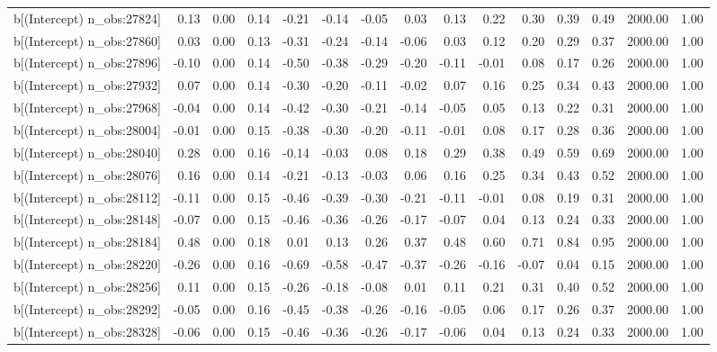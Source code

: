 \begin{table}[ht]
\begin{tabular}{rrrrrrrrrrrrrrr}
  b[(Intercept) n\_obs:27824] & 0.13 & 0.00 & 0.14 & -0.21 & -0.14 & -0.05 & 0.03 & 0.13 & 0.22 & 0.30 & 0.39 & 0.49 & 2000.00 & 1.00 \\ 
  b[(Intercept) n\_obs:27860] & 0.03 & 0.00 & 0.13 & -0.31 & -0.24 & -0.14 & -0.06 & 0.03 & 0.12 & 0.20 & 0.29 & 0.37 & 2000.00 & 1.00 \\ 
  b[(Intercept) n\_obs:27896] & -0.10 & 0.00 & 0.14 & -0.50 & -0.38 & -0.29 & -0.20 & -0.11 & -0.01 & 0.08 & 0.17 & 0.26 & 2000.00 & 1.00 \\ 
  b[(Intercept) n\_obs:27932] & 0.07 & 0.00 & 0.14 & -0.30 & -0.20 & -0.11 & -0.02 & 0.07 & 0.16 & 0.25 & 0.34 & 0.43 & 2000.00 & 1.00 \\ 
  b[(Intercept) n\_obs:27968] & -0.04 & 0.00 & 0.14 & -0.42 & -0.30 & -0.21 & -0.14 & -0.05 & 0.05 & 0.13 & 0.22 & 0.31 & 2000.00 & 1.00 \\ 
  b[(Intercept) n\_obs:28004] & -0.01 & 0.00 & 0.15 & -0.38 & -0.30 & -0.20 & -0.11 & -0.01 & 0.08 & 0.17 & 0.28 & 0.36 & 2000.00 & 1.00 \\ 
  b[(Intercept) n\_obs:28040] & 0.28 & 0.00 & 0.16 & -0.14 & -0.03 & 0.08 & 0.18 & 0.29 & 0.38 & 0.49 & 0.59 & 0.69 & 2000.00 & 1.00 \\ 
  b[(Intercept) n\_obs:28076] & 0.16 & 0.00 & 0.14 & -0.21 & -0.13 & -0.03 & 0.06 & 0.16 & 0.25 & 0.34 & 0.43 & 0.52 & 2000.00 & 1.00 \\ 
  b[(Intercept) n\_obs:28112] & -0.11 & 0.00 & 0.15 & -0.46 & -0.39 & -0.30 & -0.21 & -0.11 & -0.01 & 0.08 & 0.19 & 0.31 & 2000.00 & 1.00 \\ 
  b[(Intercept) n\_obs:28148] & -0.07 & 0.00 & 0.15 & -0.46 & -0.36 & -0.26 & -0.17 & -0.07 & 0.04 & 0.13 & 0.24 & 0.33 & 2000.00 & 1.00 \\ 
  b[(Intercept) n\_obs:28184] & 0.48 & 0.00 & 0.18 & 0.01 & 0.13 & 0.26 & 0.37 & 0.48 & 0.60 & 0.71 & 0.84 & 0.95 & 2000.00 & 1.00 \\ 
  b[(Intercept) n\_obs:28220] & -0.26 & 0.00 & 0.16 & -0.69 & -0.58 & -0.47 & -0.37 & -0.26 & -0.16 & -0.07 & 0.04 & 0.15 & 2000.00 & 1.00 \\ 
  b[(Intercept) n\_obs:28256] & 0.11 & 0.00 & 0.15 & -0.26 & -0.18 & -0.08 & 0.01 & 0.11 & 0.21 & 0.31 & 0.40 & 0.52 & 2000.00 & 1.00 \\ 
  b[(Intercept) n\_obs:28292] & -0.05 & 0.00 & 0.16 & -0.45 & -0.38 & -0.26 & -0.16 & -0.05 & 0.06 & 0.17 & 0.26 & 0.37 & 2000.00 & 1.00 \\ 
  b[(Intercept) n\_obs:28328] & -0.06 & 0.00 & 0.15 & -0.46 & -0.36 & -0.26 & -0.17 & -0.06 & 0.04 & 0.13 & 0.24 & 0.33 & 2000.00 & 1.00 \\ 

\end{tabular}
\end{table}

